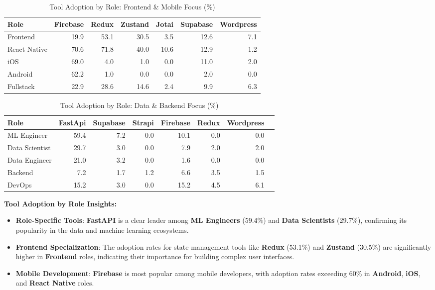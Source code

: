 \documentclass[12pt,a4paper]{article}
\begin{document}
\begin{table}[H]
    \centering
    \caption{Tool Adoption by Role: Frontend \& Mobile Focus (\%)}
    \label{tab:tool_adoption_fe_mobile}
    \small
    \begin{tabular}{lrrrrrr}
        \toprule
        \textbf{Role} & \textbf{Firebase} & \textbf{Redux} & \textbf{Zustand} & \textbf{Jotai} & \textbf{Supabase} & \textbf{Wordpress} \\
        \midrule
        Frontend & 19.9 & 53.1 & 30.5 & 3.5 & 12.6 & 7.1 \\
        React Native & 70.6 & 71.8 & 40.0 & 10.6 & 12.9 & 1.2 \\
        iOS & 69.0 & 4.0 & 1.0 & 0.0 & 11.0 & 2.0 \\
        Android & 62.2 & 1.0 & 0.0 & 0.0 & 2.0 & 0.0 \\
        Fullstack & 22.9 & 28.6 & 14.6 & 2.4 & 9.9 & 6.3 \\
        \bottomrule
    \end{tabular}
\end{table}

\begin{table}[H]
    \centering
    \caption{Tool Adoption by Role: Data \& Backend Focus (\%)}
    \label{tab:tool_adoption_data_backend}
    \small
    \begin{tabular}{lrrrrrrr}
        \toprule
        \textbf{Role} & \textbf{FastApi} & \textbf{Supabase} & \textbf{Strapi} & \textbf{Firebase} & \textbf{Redux} & \textbf{Wordpress} \\
        \midrule
        ML Engineer & 59.4 & 7.2 & 0.0 & 10.1 & 0.0 & 0.0 \\
        Data Scientist & 29.7 & 3.0 & 0.0 & 7.9 & 2.0 & 2.0 \\
        Data Engineer & 21.0 & 3.2 & 0.0 & 1.6 & 0.0 & 0.0 \\
        Backend & 7.2 & 1.7 & 1.2 & 6.6 & 3.5 & 1.5 \\
        DevOps & 15.2 & 3.0 & 0.0 & 15.2 & 4.5 & 6.1 \\
        \bottomrule
    \end{tabular}
\end{table}

\textbf{Tool Adoption by Role Insights:}
\begin{itemize}
	\item \textbf{Role-Specific Tools}: \textbf{FastAPI} is a clear leader among \textbf{ML Engineers} (59.4\%) and \textbf{Data Scientists} (29.7\%), confirming its popularity in the data and machine learning ecosystems.
	\item \textbf{Frontend Specialization}: The adoption rates for state management tools like \textbf{Redux} (53.1\%) and \textbf{Zustand} (30.5\%) are significantly higher in \textbf{Frontend} roles, indicating their importance for building complex user interfaces.
	\item \textbf{Mobile Development}: \textbf{Firebase} is most popular among mobile developers, with adoption rates exceeding 60\% in \textbf{Android}, \textbf{iOS}, and \textbf{React Native} roles.
\end{itemize}
\end{document}
